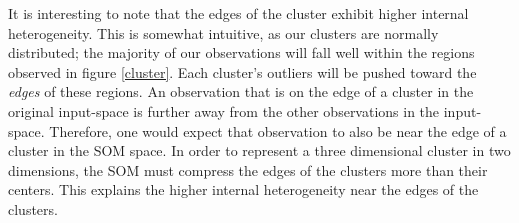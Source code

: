 It is interesting to note that the edges of the cluster exhibit higher internal heterogeneity.  
This is somewhat intuitive, as our clusters are normally distributed; the
majority of our observations will fall well within the regions observed in
figure \ref{cluster}. Each cluster's outliers will be pushed toward the
\emph{edges} of these regions. An observation that is on the edge of a cluster
in the original input-space is further away from the other observations in the
input-space.  Therefore, one would expect that observation to also be near the
edge of a cluster in the SOM space.  In order to represent a three dimensional
cluster in two dimensions, the SOM must compress the edges of the clusters
more than their centers.  This explains the higher internal heterogeneity near
the edges of the clusters. 


